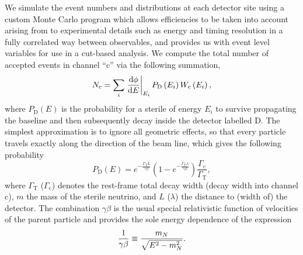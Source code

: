\documentclass[11pt, a4paper]{article}
\def\ster{\ensuremath N}
\begin{document}
We simulate the event numbers and distributions at each detector site using a custom
Monte Carlo program which allows efficiencies to be taken into account arising from to
experimental details such as energy and timing resolution in a fully correlated
way between observables, and provides us with event level variables for use in
a cut-based analysis. We compute the total number of accepted events in
channel ``$\text{c}$'' via the following summation,
%
\[ \ster_\text{c} = \sum_{i} \left .
\frac{\mathrm{d}\phi}{\mathrm{d}E}\right|_{E_i} P_\text{D}\left(E_i\right)
W_\text{c}\left(E_i\right),  \]
%
where $P_\text{D}(E)$ is the probability for a sterile of energy $E_i$ to survive propagating the baseline
and then subsequently decay inside the detector labelled $\text{D}$. The simplest
approximation is to ignore all geometric effects, so that every particle
travels exactly along the direction of the beam line, which gives the following
probability 
%
\[ P_\text{D}\left(E\right) = e^{-\frac{\Gamma_\text{T}L}{\gamma\beta}}\left(
1-
e^{-\frac{\Gamma_\text{T}\lambda}{\gamma\beta}}\right)\frac{\Gamma_\text{c}}{\Gamma_\text{T}},
\label{eq:prob} \]
%
where $\Gamma_\text{T}$ ($\Gamma_\text{c}$) denotes the rest-frame total decay
width (decay width into channel $\text{c}$), $m$ the mass of the sterile
neutrino, and $L$ ($\lambda$) the distance to (width of) the detector. The
combination $\gamma\beta$ is the usual special relativistic function of
velocities of the parent particle and provides the sole energy dependence of
the expression
%
\[   \frac{1}{\gamma\beta} \equiv \frac{m_\ster}{\sqrt{E^2-m_\ster^2}}. \]
%
\end{document}
